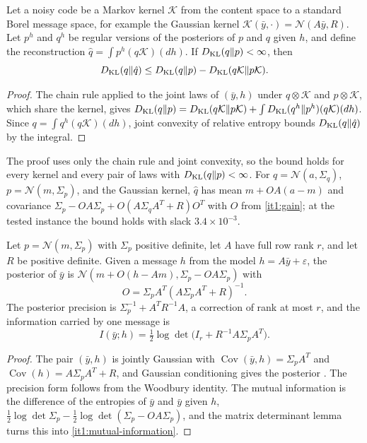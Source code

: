 \documentclass[11pt,letterpaper]{report}
\begin{document}
Let a noisy code be a Markov kernel $\mathcal K$ from the content space to a standard Borel message space, for example the Gaussian kernel $\mathcal K(\bar y,\cdot)=\mathcal N(A\bar y,R)$. Let $p^h$ and $q^h$ be regular versions of the posteriors of $p$ and $q$ given $h$, and define the reconstruction $\hat q=\int p^h(q\mathcal K)(dh)$. If $D_{\mathrm{KL}}(q\Vert p)<\infty$, then
\begin{equation}
D_{\mathrm{KL}}(q\Vert\hat q)\leq D_{\mathrm{KL}}(q\Vert p)-D_{\mathrm{KL}}(q\mathcal K\Vert p\mathcal K).
\label{it1:noisy-eq}
\end{equation}
\begin{proof}
The chain rule applied to the joint laws of $(\bar y,h)$ under $q\otimes\mathcal K$ and $p\otimes\mathcal K$, which share the kernel, gives $D_{\mathrm{KL}}(q\Vert p)=D_{\mathrm{KL}}(q\mathcal K\Vert p\mathcal K)+\int D_{\mathrm{KL}}(q^h\Vert p^h)(q\mathcal K)(dh)$. Since $q=\int q^h(q\mathcal K)(dh)$, joint convexity of relative entropy bounds $D_{\mathrm{KL}}(q\Vert\hat q)$ by the integral.
\end{proof}

The proof uses only the chain rule and joint convexity, so the bound holds for every kernel and every pair of laws with $D_{\mathrm{KL}}(q\Vert p)<\infty$. For $q=\mathcal N(a,\Sigma_q)$, $p=\mathcal N(m,\Sigma_p)$, and the Gaussian kernel, $\hat q$ has mean $m+OA(a-m)$ and covariance $\Sigma_p-OA\Sigma_p+O(A\Sigma_qA^T+R)O^T$ with $O$ from \cref{it1:gain}; at the tested instance the bound holds with slack $3.4\times10^{-3}$.

Let $p=\mathcal N(m,\Sigma_p)$ with $\Sigma_p$ positive definite, let $A$ have full row rank $r$, and let $R$ be positive definite. Given a message $h$ from the model $h=A\bar y+\varepsilon$, the posterior of $\bar y$ is $\mathcal N(m+O(h-Am),\Sigma_p-OA\Sigma_p)$ with
\begin{equation}
O=\Sigma_pA^T(A\Sigma_pA^T+R)^{-1}.
\label{it1:gain}
\end{equation}
The posterior precision is $\Sigma_p^{-1}+A^TR^{-1}A$, a correction of rank at most $r$, and the information carried by one message is
\begin{equation}
I(\bar y;h)=\tfrac12\log\det\bigl(I_r+R^{-1}A\Sigma_pA^T\bigr).
\label{it1:mutual-information}
\end{equation}
\begin{proof}
The pair $(\bar y,h)$ is jointly Gaussian with $\operatorname{Cov}(\bar y,h)=\Sigma_pA^T$ and $\operatorname{Cov}(h)=A\Sigma_pA^T+R$, and Gaussian conditioning gives the posterior \citep{Kalman1960}. The precision form follows from the Woodbury identity. The mutual information is the difference of the entropies of $\bar y$ and $\bar y$ given $h$, $\frac12\log\det\Sigma_p-\frac12\log\det(\Sigma_p-OA\Sigma_p)$, and the matrix determinant lemma turns this into \cref{it1:mutual-information}.
\end{proof}
\end{document}
